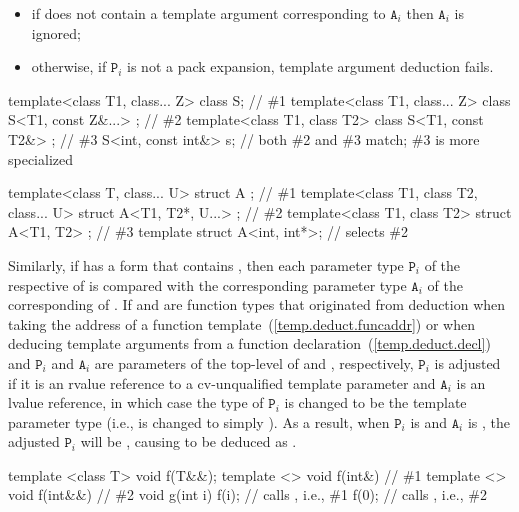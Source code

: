 \begin{itemize}
\item if  does not contain a template argument corresponding to
$\texttt{A}_i$ then $\texttt{A}_i$ is ignored;

\item otherwise, if $\texttt{P}_i$ is not a pack expansion, template argument
deduction fails.
\end{itemize}
\enterexample
\begin{codeblock}
template<class T1, class... Z> class S;                               // \#1
template<class T1, class... Z> class S<T1, const Z&...> { };          // \#2
template<class T1, class T2>   class S<T1, const T2&> { };            // \#3
S<int, const int&> s;         // both \#2 and \#3 match; \#3 is more specialized

template<class T, class... U>            struct A { };                // \#1
template<class T1, class T2, class... U> struct A<T1, T2*, U...> { }; // \#2
template<class T1, class T2>             struct A<T1, T2> { };        // \#3
template struct A<int, int*>; // selects \#2
\end{codeblock}
\exitexample

\pnum
Similarly, if  has a form that contains
, then each parameter type $\texttt{P}_i$
of the respective  of
 is compared with the corresponding parameter type
$\texttt{A}_i$ of the corresponding 
of .
If  and  are function types that originated from deduction when
taking the address of a function template~(\ref{temp.deduct.funcaddr}) or when
deducing template arguments from a function declaration~(\ref{temp.deduct.decl})
and $\texttt{P}_i$ and $\texttt{A}_i$ are parameters of the top-level
 of  and , respectively,
$\texttt{P}_i$ is adjusted if it is an rvalue reference to a cv-unqualified template
parameter and $\texttt{A}_i$ is an lvalue reference, in which case the type of
$\texttt{P}_i$ is changed to be the template parameter type (i.e.,  is
changed to simply ). \enternote As a result, when $\texttt{P}_i$ is 
and $\texttt{A}_i$ is , the adjusted $\texttt{P}_i$ will be ,
causing  to be deduced as . \exitnote
\enterexample
\begin{codeblock}
template <class T> void f(T&&);
template <> void f(int&) { }  // \#1
template <> void f(int&&) { } // \#2
void g(int i) {
  f(i);                       // calls , i.e., \#1
  f(0);                       // calls , i.e., \#2
}
\end{codeblock}
\exitexample

